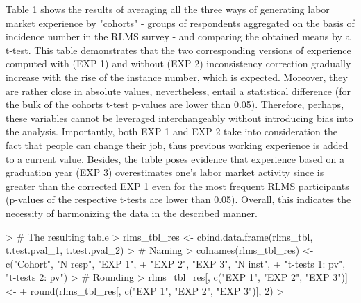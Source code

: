 \documentclass[12pt,a4paper]{article}
\begin{document}
Table 1 shows the results of averaging all the three ways of generating labor market experience by "cohorts" - groups of respondents aggregated on the basis of incidence number in the RLMS survey - and comparing the obtained means by a t-test. This table demonstrates that the two corresponding versions of experience computed with (EXP 1) and without (EXP 2) inconsistency correction gradually increase with the rise of the instance number, which is expected. Moreover, they are rather close in absolute values, nevertheless, entail a statistical difference (for the bulk of the cohorts t-test p-values are lower than 0.05). Therefore, perhaps, these variables cannot be leveraged interchangeably without introducing bias into the analysis. Importantly, both EXP 1 and EXP 2 take into consideration the fact that people can change their job, thus previous working experience is added to a current value. Besides, the table poses evidence that experience based on a graduation year (EXP 3) overestimates one's labor market activity since is greater than the corrected EXP 1 even for the most frequent RLMS participants (p-values of the respective t-tests are lower than 0.05). Overall, this indicates the necessity of harmonizing the data in the described manner. 
\\

\begin{Schunk}
\begin{Sinput}
> # The resulting table
> rlms_tbl_res <- cbind.data.frame(rlms_tbl, t.test.pval_1, t.test.pval_2)
> # Naming
> colnames(rlms_tbl_res) <- c("Cohort", "N resp", "EXP 1",
+                             "EXP 2", "EXP 3", "N inst",
+                             "t-tests 1: pv", "t-tests 2: pv")
> # Rounding
> rlms_tbl_res[, c("EXP 1", "EXP 2", "EXP 3")] <-
+   round(rlms_tbl_res[, c("EXP 1", "EXP 2", "EXP 3")], 2)
> 
\end{Sinput}
\end{Schunk}
\end{document}
